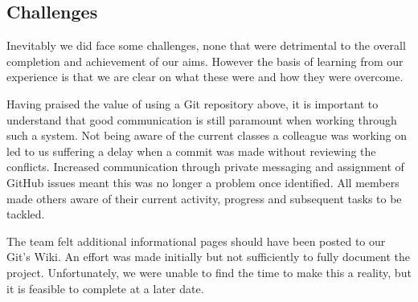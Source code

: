 \subsection{Challenges}
Inevitably we did face some challenges, none that were detrimental to the overall completion and achievement of our aims. However the basis of learning from our experience is that we are clear on what these were and how they were overcome. 

Having praised the value of using a Git repository above, it is important to understand that good communication is still paramount when working through such a system. Not being aware of the current classes a colleague was working on led to us suffering a delay when a commit was made without reviewing the conflicts. Increased communication through private messaging and assignment of GitHub issues meant this was no longer a problem once identified. All members made others aware of their current activity, progress and subsequent tasks to be tackled.

The team felt additional informational pages should have been posted to our Git's Wiki. An effort was made initially but not sufficiently to fully document the project. Unfortunately, we were unable to find the time to make this a reality, but it is feasible to complete at a later date.

